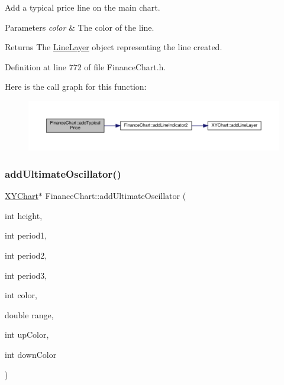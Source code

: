 Add a typical price line on the main chart. 


\begin{DoxyParams}{Parameters}
{\em color} & The color of the line.\\
\hline
\end{DoxyParams}
\begin{DoxyReturn}{Returns}
The \hyperlink{class_line_layer}{Line\+Layer} object representing the line created.
\end{DoxyReturn}


Definition at line 772 of file Finance\+Chart.\+h.

Here is the call graph for this function\+:
\nopagebreak
\begin{figure}[H]
\begin{center}
\leavevmode
\includegraphics[width=350pt]{class_finance_chart_a5ca57264dde9060ca5a59f60303f1e75_cgraph}
\end{center}
\end{figure}
\mbox{\label{class_finance_chart_aa7a2bc1fab9c1ec538ff293c107d6cc4}} 
\subsubsection{\texorpdfstring{add\+Ultimate\+Oscillator()}{addUltimateOscillator()}}
{\footnotesize\ttfamily \hyperlink{class_x_y_chart}{X\+Y\+Chart}$\ast$ Finance\+Chart\+::add\+Ultimate\+Oscillator (\begin{DoxyParamCaption}\item[{int}]{height,  }\item[{int}]{period1,  }\item[{int}]{period2,  }\item[{int}]{period3,  }\item[{int}]{color,  }\item[{double}]{range,  }\item[{int}]{up\+Color,  }\item[{int}]{down\+Color }\end{DoxyParamCaption})\hspace{0.3cm}{\ttfamily [inline]}}



